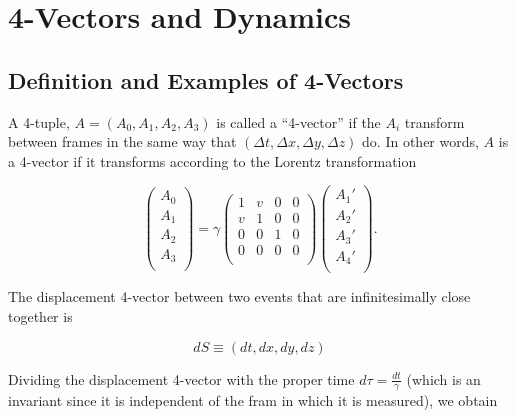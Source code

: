 \documentclass[english,a4paper,12pt]{report}
\begin{document}
\chapter{4-Vectors and Dynamics}

\section{Definition and Examples of 4-Vectors}

\begin{definition}
A 4-tuple, \(A = (A_0 , A_1 , A_2 , A_3 )\) is called a ``4-vector'' if the \(A_{i} \) transform between frames in the same way that \((\Delta t, \Delta x, \Delta y, \Delta z)\) do. In other words, \(A\) is a 4-vector if it transforms according to the Lorentz transformation

\begin{equation}
    \begin{pmatrix}
         A_0  \\
         A_1  \\
         A_2  \\
         A_3  \\
    \end{pmatrix} = \gamma \begin{pmatrix}
        1  & v & 0 & 0  \\
        v & 1 & 0 & 0  \\
        0 & 0 & 1 & 0  \\
        0 & 0 & 0 & 0  \\
    \end{pmatrix} \begin{pmatrix}
         A_1 ' \\
         A_2 ' \\
         A_3 ' \\
         A_4 ' \\
    \end{pmatrix}.
\end{equation}
\end{definition}

The displacement 4-vector between two events that are infinitesimally close together is 

\begin{equation}
    dS \equiv (dt,dx,dy,dz)
\end{equation}

Dividing the displacement 4-vector with the proper time \(d \tau = \frac{dt}{\gamma } \) (which is an invariant since it is independent of the fram in which it is measured), we obtain 
\end{document}
